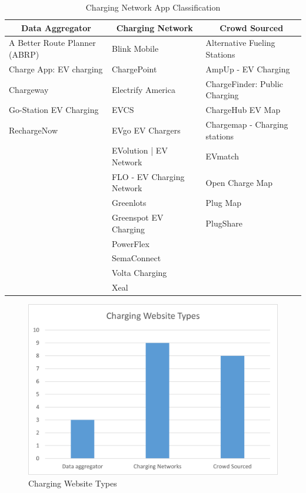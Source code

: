 \documentclass[conference]{IEEEtran}
\begin{document}
\begin{table}[htbp]
\caption{Charging Network App Classification}
\begin{center}
\begin{tabular}{|l|l|l|}
\hline
\multicolumn{1}{|c|}{\textbf{Data Aggregator}} & \multicolumn{1}{c|}{\textbf{Charging Network}} & \multicolumn{1}{c|}{\textbf{Crowd Sourced}} \\
\hline
A Better Route Planner (ABRP) & Blink Mobile & Alternative Fueling Stations \\
Charge App: EV charging & ChargePoint & AmpUp - EV Charging \\
Chargeway & Electrify America & ChargeFinder: Public Charging \\
Go-Station EV Charging & EVCS & ChargeHub EV Map \\
RechargeNow & EVgo EV Chargers & Chargemap - Charging stations \\
 & EVolution | EV Network & EVmatch \\
 & FLO - EV Charging Network & Open Charge Map \\
 & Greenlots & Plug Map \\
 & Greenspot EV Charging & PlugShare \\
 & PowerFlex &  \\
 & SemaConnect & \\
 & Volta Charging &  \\
 & Xeal & \\
\hline
\end{tabular}
\label{tab3}
\end{center}
\end{table}

\begin{figure}[htbp]
\centerline{\includegraphics[width=\columnwidth]{Picture1.png}}
\caption{Charging Website Types}
\label{fig1}
\end{figure}
\end{document}
